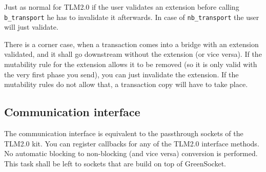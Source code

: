 \documentclass[a4paper,10pt]{article}          %
\begin{document}
Just as normal for TLM2.0 if the user validates an extension before calling \verb|b_transport| he has to invalidate it afterwards.
In case of \verb|nb_transport| the user will just validate.

There is a corner case, when a transaction comes into a bridge with an extension validated, and it shall go downstream without the extension (or vice versa). If the mutability rule for the extension allows it to be removed (so it is only valid with the very first phase you send), you can just invalidate the extension. If the mutability rules do not allow that, a transaction copy will have to take place.

\vspace{4mm}
\subsection{Communication interface}
\vspace{4mm}

The communication interface is equivalent to the passthrough sockets of the TLM2.0 kit. You can register callbacks for any of the TLM2.0 interface methods. No automatic blocking to non-blocking (and vice versa) conversion is performed. This task shall be left to sockets that are build on top of GreenSocket.
\end{document}
